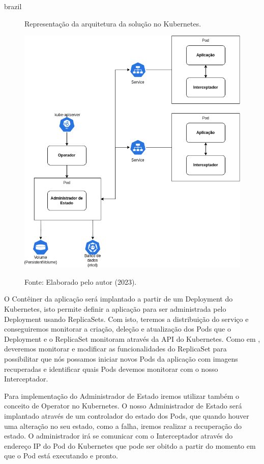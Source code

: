 \begin{otherlanguage*}{brazil}
\begin{figure}[h]
\centering
\caption{Representação da arquitetura da solução no Kubernetes.}
\includegraphics[scale=0.46]{images/kubernetes-architecture.png}
\label{fig:kubernetes-architecture}
\caption*{Fonte: Elaborado pelo autor (2023).}
\end{figure}

O Contêiner da aplicação será implantado a partir de um Deployment do Kubernetes, isto
permite definir a aplicação para ser administrada pelo Deployment usando ReplicaSets.
Com isto, teremos a distribuição do serviço e conseguiremos monitorar a criação, deleção
e atualização dos Pods que o Deployment e o ReplicaSet monitoram através da API do
Kubernetes. Como em \cite{schmidt2023state}, deveremos monitorar e modificar as
funcionalidades do ReplicaSet para possibilitar que nós possamos iniciar novos Pods
da aplicação com imagens recuperadas e identificar quais Pods devemos monitorar com
o nosso Interceptador.

Para implementação do Administrador de Estado iremos utilizar também o conceito de Operator
no Kubernetes. O nosso Administrador de Estado será implantado através de um controlador do
estado dos Pods, que quando houver uma alteração no seu estado, como a falha, iremos
realizar a recuperação do estado. O administrador irá se comunicar com o Interceptador através
do endereço IP do Pod do Kubernetes que pode ser obitdo a partir do momento em que o Pod está
executando e pronto.


\end{otherlanguage*}
